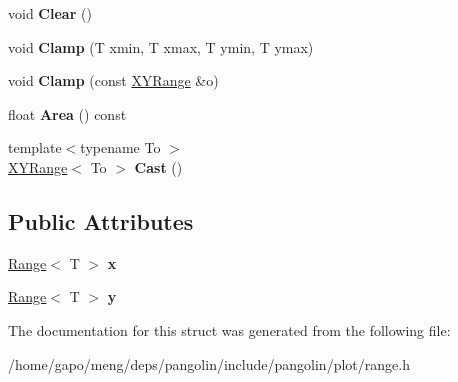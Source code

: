 \begin{DoxyCompactItemize}
\item 
void {\bfseries Clear} ()\hypertarget{structpangolin_1_1_x_y_range_a2e7da2c4c98f1c8dba6330f31859c6df}{}\label{structpangolin_1_1_x_y_range_a2e7da2c4c98f1c8dba6330f31859c6df}

\item 
void {\bfseries Clamp} (T xmin, T xmax, T ymin, T ymax)\hypertarget{structpangolin_1_1_x_y_range_acec2d0e05cd486bc50842aed1a90fe0f}{}\label{structpangolin_1_1_x_y_range_acec2d0e05cd486bc50842aed1a90fe0f}

\item 
void {\bfseries Clamp} (const \hyperlink{structpangolin_1_1_x_y_range}{X\+Y\+Range} \&o)\hypertarget{structpangolin_1_1_x_y_range_ab100b680562e6ce1ea757ff56c4e58be}{}\label{structpangolin_1_1_x_y_range_ab100b680562e6ce1ea757ff56c4e58be}

\item 
float {\bfseries Area} () const \hypertarget{structpangolin_1_1_x_y_range_a29b9782e329c4d2792f4f4ffbf93080c}{}\label{structpangolin_1_1_x_y_range_a29b9782e329c4d2792f4f4ffbf93080c}

\item 
{\footnotesize template$<$typename To $>$ }\\\hyperlink{structpangolin_1_1_x_y_range}{X\+Y\+Range}$<$ To $>$ {\bfseries Cast} ()\hypertarget{structpangolin_1_1_x_y_range_a565b02ecbdacae13847047942dd80dc3}{}\label{structpangolin_1_1_x_y_range_a565b02ecbdacae13847047942dd80dc3}

\end{DoxyCompactItemize}
\subsection*{Public Attributes}
\begin{DoxyCompactItemize}
\item 
\hyperlink{structpangolin_1_1_range}{Range}$<$ T $>$ {\bfseries x}\hypertarget{structpangolin_1_1_x_y_range_a2bdc18138079ea2243dfa672226bc8dc}{}\label{structpangolin_1_1_x_y_range_a2bdc18138079ea2243dfa672226bc8dc}

\item 
\hyperlink{structpangolin_1_1_range}{Range}$<$ T $>$ {\bfseries y}\hypertarget{structpangolin_1_1_x_y_range_a77d7792ab0322e8f3a6722302da91dce}{}\label{structpangolin_1_1_x_y_range_a77d7792ab0322e8f3a6722302da91dce}

\end{DoxyCompactItemize}


The documentation for this struct was generated from the following file\+:\begin{DoxyCompactItemize}
\item 
/home/gapo/meng/deps/pangolin/include/pangolin/plot/range.\+h\end{DoxyCompactItemize}
